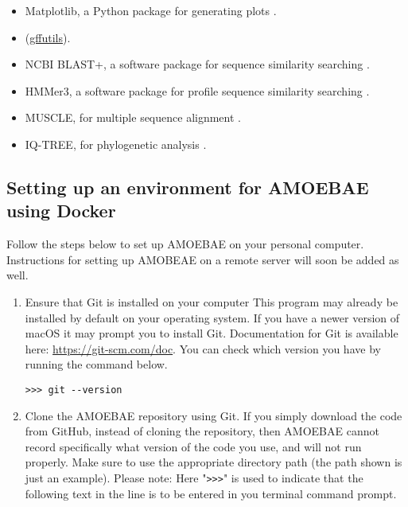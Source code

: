 \documentclass[12pt,letterpaper]{article}
\begin{document}
\begin{linenumbers}
\begin{itemize}
\item Matplotlib, a Python package for generating plots \citep{hunter2007}.

\item (\href{https://pythonhosted.org/gffutils/}{gffutils}).

\item NCBI BLAST+, a software package for sequence similarity searching \citep{camacho2009}.

\item HMMer3, a software package for profile sequence similarity searching \citep{eddy1998}.

\item MUSCLE, for multiple sequence alignment \citep{edgar2004}.

\item IQ-TREE, for phylogenetic analysis \citep{nguyen2015}.


\end{itemize}


\subsection{Setting up an environment for AMOEBAE using Docker}
\label{setup_section}


Follow the steps below to set up AMOEBAE on your personal computer.
Instructions for setting up AMOBEAE on a remote server will soon be added as
well.

\begin{enumerate}

\item Ensure that Git is installed on your computer This program may already be
    installed by default on your operating system. If you have a newer version
        of macOS it may prompt you to install Git. Documentation for Git is
        available here: \url{https://git-scm.com/doc}. You can check which
        version you have by running the command below.

\begin{lstlisting}
>>> git --version
\end{lstlisting}

\item Clone the AMOEBAE repository using Git. If you simply download the code
    from GitHub, instead of cloning the repository, then AMOEBAE cannot record
        specifically what version of the code you use, and will not run
        properly. Make sure to use the appropriate directory path (the path
        shown is just an example).  Please note: Here "\texttt{>{}>{}>}" is
        used to indicate that the following text in the line is to be entered
        in you terminal command prompt.


\end{enumerate}
\end{linenumbers}
\end{document}
